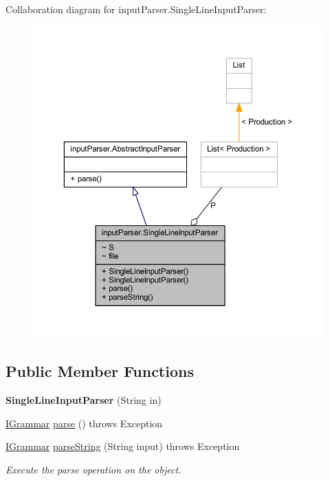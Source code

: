 Collaboration diagram for input\-Parser.\-Single\-Line\-Input\-Parser\-:
\nopagebreak
\begin{figure}[H]
\begin{center}
\leavevmode
\includegraphics[width=350pt]{classinput_parser_1_1_single_line_input_parser__coll__graph}
\end{center}
\end{figure}
\subsection*{Public Member Functions}
\begin{DoxyCompactItemize}
\item 
\hypertarget{classinput_parser_1_1_single_line_input_parser_a3efb0396347ec7ed7376dbd37eb4d28c}{{\bfseries Single\-Line\-Input\-Parser} (String in)}\label{classinput_parser_1_1_single_line_input_parser_a3efb0396347ec7ed7376dbd37eb4d28c}

\item 
\hyperlink{interfacecontext_free_1_1grammar_1_1_i_grammar}{I\-Grammar} \hyperlink{classinput_parser_1_1_single_line_input_parser_ad822676b0d3182a591e2004c3bcc79d5}{parse} ()  throws Exception 
\item 
\hyperlink{interfacecontext_free_1_1grammar_1_1_i_grammar}{I\-Grammar} \hyperlink{classinput_parser_1_1_single_line_input_parser_a90641140f8686fc97fd40b72beccf0a3}{parse\-String} (String input)  throws Exception 
\begin{DoxyCompactList}\small\item\em Execute the parse operation on the object. \end{DoxyCompactList}\end{DoxyCompactItemize}
